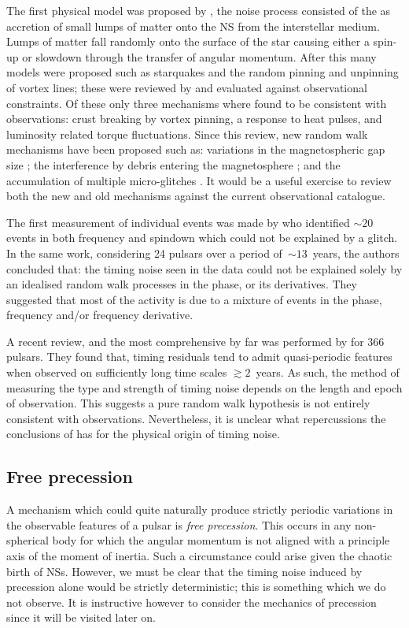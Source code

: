 The first physical model was proposed by \citet{Boynton1972}, the noise process
consisted of the as accretion of small lumps of matter onto the NS from the
interstellar medium. Lumps of matter fall randomly onto the surface of the star
causing either a spin-up or slowdown through the transfer of angular momentum.
After this many models were proposed such as starquakes and the random pinning
and unpinning of vortex lines; these were reviewed by \citet{Cordes1981} and
evaluated against observational constraints. Of these only three mechanisms
where found to be consistent with observations: crust breaking by vortex pinning, a
response to heat pulses, and luminosity related torque fluctuations. Since this
review, new random walk mechanisms have been proposed such as: variations in
the magnetospheric gap size \citep{Cheng1987}; the interference by debris entering
the magnetosphere \citep{Cordes2008}; and the accumulation of multiple micro-glitches
\citep{Janssen2006}. It would be a useful exercise to review both the new and 
old mechanisms against the current observational catalogue.

The first measurement of individual events was made by \citet{Cordes1985} who
identified $\sim20$ events in both frequency and spindown which could not be
explained by a glitch. In the same work, considering 24 pulsars over a period
of~$\sim13$~years, the authors concluded that: the timing noise seen in the
data could not be explained solely by an idealised random walk processes in the
phase, or its derivatives. They suggested that most of the activity is due to a
mixture of events in the phase, frequency and/or frequency derivative.

A recent review, and the most comprehensive by far was performed by
\citet{Hobbs2010} for 366 pulsars. They found that, timing residuals tend to
admit quasi-periodic features when observed on sufficiently long time scales
$\gtrsim 2$~years. As such, the method of measuring the type and strength of
timing noise depends on the length and epoch of observation. This suggests a
pure random walk hypothesis is not entirely consistent with observations.
Nevertheless, it is unclear what repercussions the conclusions of
\citet{Hobbs2010} has for the physical origin of timing noise.

\subsection{Free precession}
\label{sec: free precession}

A mechanism which could quite naturally produce strictly periodic variations in the
observable features of a pulsar is \emph{free precession}. This occurs in any
non-spherical body for which the angular momentum is not aligned with a principle
axis of the moment of inertia. Such a circumstance could arise given the
chaotic birth of NSs. However, we must be clear that the timing noise induced by 
precession alone would be strictly deterministic; this is something which we do
not observe.
It is instructive however to consider the mechanics of precession since it will
be visited later on.

